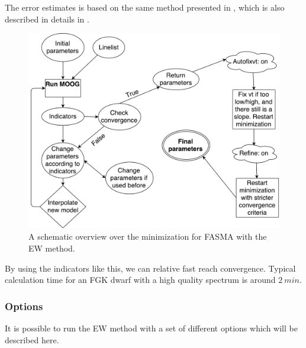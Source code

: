\documentclass{aa}
\begin{document}
The error estimates is based on the same method presented in
\citet{Gonzalez2000}, which is also described in details in
\citet{Santos2003,Andreasen2016}.

\begin{figure}[tpb]
    \centering
    \includegraphics[width=1.0\linewidth]{figures/FASMA_minimization.pdf}
    \caption{A schematic overview over the minimization for FASMA with the
    EW method.}
    \label{fig:FASMA_minimization}
\end{figure}

By using the indicators like this, we can relative fast reach convergence.
Typical calculation time for an FGK dwarf with a high quality spectrum is around
$\SI{2}{min}$.

\subsubsection{Options}
\label{subs:EWoptions}
It is possible to run the EW method with a set of different options which
will be described here.
\end{document}

